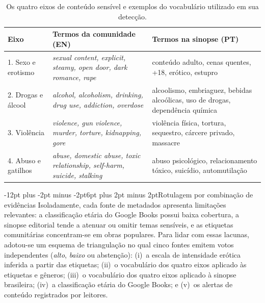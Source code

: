 \documentclass[12pt]{article}
\makeatletter
\renewcommand{\subsection}{\@startsection{subsection}{2}{\z@}%
  {-12pt plus -2pt minus -2pt}{6pt plus 2pt minus 2pt}{\normalfont\normalsize\bfseries}}
\makeatother
\begin{document}
\begin{table}[H]
\centering\small
\caption{Os quatro eixos de conteúdo sensível e exemplos do vocabulário utilizado em sua detecção.}
\label{tab:eixos}
\begin{tabular}{lp{5.2cm}p{5.2cm}}
\toprule
\textbf{Eixo} & \textbf{Termos da comunidade (EN)} & \textbf{Termos na sinopse (PT)} \\
\midrule
1. Sexo e erotismo & \emph{sexual content, explicit, steamy, open door, dark romance, rape} & conteúdo adulto, cenas quentes, +18, erótico, estupro \\
2. Drogas e álcool & \emph{alcohol, alcoholism, drinking, drug use, addiction, overdose} & alcoolismo, embriaguez, bebidas alcoólicas, uso de drogas, dependência química \\
3. Violência & \emph{violence, gun violence, murder, torture, kidnapping, gore} & violência física, tortura, sequestro, cárcere privado, massacre \\
4. Abuso e gatilhos & \emph{abuse, domestic abuse, toxic relationship, self-harm, suicide, stalking} & abuso psicológico, relacionamento tóxico, suicídio, automutilação \\
\bottomrule
\end{tabular}
\end{table}

\subsection{Rotulagem por combinação de evidências}
\label{sec:triang}
Isoladamente, cada fonte de metadados apresenta limitações relevantes: a classificação etária do Google Books possui baixa cobertura, a sinopse editorial tende a atenuar ou omitir temas sensíveis, e as etiquetas comunitárias concentram-se em obras populares. Para lidar com essas lacunas, adotou-se um esquema de triangulação no qual cinco fontes emitem votos independentes (\emph{alto}, \emph{baixo} ou abstenção): (i)~a escala de intensidade erótica inferida a partir das etiquetas; (ii)~o vocabulário dos quatro eixos aplicado às etiquetas e gêneros; (iii)~o vocabulário dos quatro eixos aplicado à sinopse brasileira; (iv)~a classificação etária do Google Books; e (v)~os alertas de conteúdo registrados por leitores.
\end{document}
